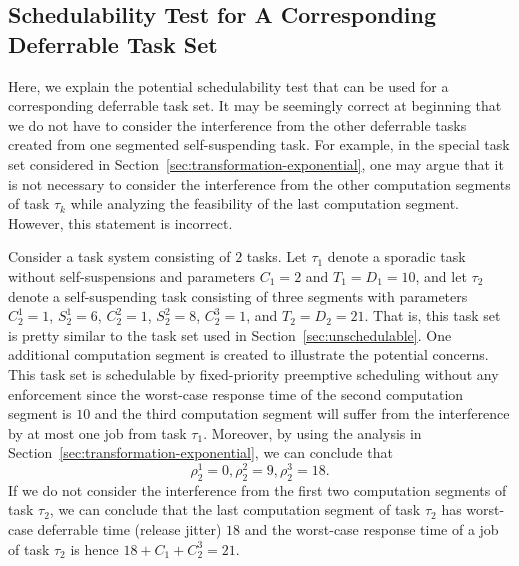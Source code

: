 \subsection{Schedulability Test for A Corresponding Deferrable Task Set}
\label{sec:schedulability-test-deferrable}

Here, we explain the potential schedulability test that can be used for a corresponding deferrable task set. It may be seemingly correct at beginning that we do not have to consider the interference from the other deferrable tasks created from one segmented self-suspending task. For example, in the special task set considered in Section~\ref{sec:transformation-exponential}, one may argue that it is not necessary to consider the interference from the other computation segments of task $\tau_k$ while analyzing the feasibility of the last computation segment. However, this statement is incorrect.

Consider a task system consisting of $2$ tasks. Let $\tau_1$ denote a sporadic task without self-suspensions and parameters $C_1 = 2$ and $T_1=D_1=10$, and let $\tau_2$ denote a self-suspending task consisting of three segments with parameters  $C_2^1 = 1$,  $S_2^1 = 6$, $C_2^2=1$, $S_2^2=8$, $C_2^3=1$, and $ T_2=D_2=21$. That is, this task set is pretty similar to the task set used in Section~\ref{sec:unschedulable}. One additional computation
segment is created to illustrate the potential concerns. This task set is schedulable by fixed-priority preemptive scheduling without any enforcement since the worst-case response time of the second computation segment is $10$ and the third computation segment will suffer from the interference by at most one job from task $\tau_1$. Moreover, by using the analysis in Section~\ref{sec:transformation-exponential}, we can conclude that
\begin{equation*}
  \rho_2^1 = 0, \rho_2^2 = 9, \rho_2^3 = 18.
\end{equation*}
If we do not consider the interference from the first two computation segments of task $\tau_2$, we can conclude that the last computation segment of task $\tau_2$ has worst-case deferrable time (release jitter) $18$ and the worst-case response time of a job of task $\tau_2$ is hence $18+C_1+C_2^3=21$.

